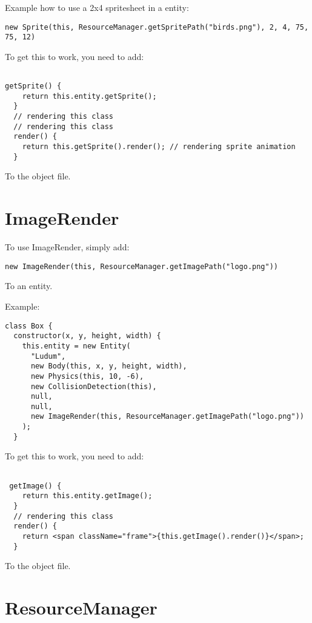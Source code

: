 Example how to use a 2x4 spritesheet in a entity:

\begin{lstlisting}
new Sprite(this, ResourceManager.getSpritePath("birds.png"), 2, 4, 75, 75, 12)
\end{lstlisting}

To get this to work, you need to add:
\begin{lstlisting}

getSprite() {
    return this.entity.getSprite();
  }
  // rendering this class
  // rendering this class
  render() {
    return this.getSprite().render(); // rendering sprite animation
  }
\end{lstlisting}

To the object file.




\section{ImageRender}
To use ImageRender, simply add:

\begin{lstlisting}
new ImageRender(this, ResourceManager.getImagePath("logo.png"))
\end{lstlisting}

To an entity.

Example:
\begin{lstlisting}
class Box {
  constructor(x, y, height, width) {
    this.entity = new Entity(
      "Ludum",
      new Body(this, x, y, height, width),
      new Physics(this, 10, -6),
      new CollisionDetection(this),
      null,
      null,
      new ImageRender(this, ResourceManager.getImagePath("logo.png"))
    );
  }
\end{lstlisting}

\newpage

To get this to work, you need to add:
\begin{lstlisting}

 getImage() {
    return this.entity.getImage();
  }
  // rendering this class
  render() {
    return <span className="frame">{this.getImage().render()}</span>;
  }
\end{lstlisting}

To the object file.

\section{ResourceManager}

